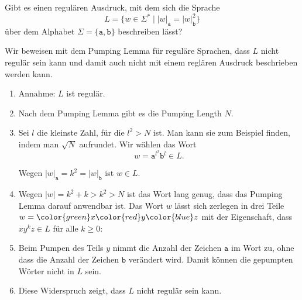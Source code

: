 Gibt es einen regulären Ausdruck, mit dem sich die Sprache
\[
L=\{w\in\Sigma^*\mid |w|_{\texttt{a}} = |w|_{\texttt{b}}^2\}
\]
über dem Alphabet $\Sigma=\{\texttt{a},\texttt{b}\}$
beschreiben lässt?


\begin{loesung}
Wir beweisen mit dem Pumping Lemma für reguläre Sprachen, dass $L$
nicht regulär sein kann und damit auch nicht mit einem reglären Ausdruck
beschrieben werden kann.
\begin{enumerate}
\item Annahme: $L$ ist regulär.
\item Nach dem Pumping Lemma gibt es die Pumping Length $N$.
\item Sei $l$ die kleinste Zahl, für die $l^2>N$ ist. 
Man kann sie zum Beispiel finden, indem man $\sqrt{N}$ aufrundet.
Wir wählen das Wort
\[
w
=
\texttt{a}^{l^2}\texttt{b}^l
\in
L.
\]
\begin{center}
\end{center}
Wegen $|w|_{\texttt{a}} = k^2 = |w|_{\texttt{b}}$ ist $w\in L$.
\item
Wegen $|w|=k^2+k>k^2>N$ ist das Wort lang genug, dass das Pumping Lemma
darauf anwendbar ist.
Das Wort $w$ lässt sich zerlegen in drei Teile
$w={\color{green}x}{\color{red}y}{\color{blue}z}$ mit der
Eigenschaft, dass $xy^kz\in L$ für alle $k\ge 0$:
\begin{center}
\end{center}
\item
Beim Pumpen des Teils $y$ nimmt die Anzahl der Zeichen $\texttt{a}$ 
im Wort zu, ohne dass die Anzahl der Zeichen $\texttt{b}$ verändert wird.
Damit können die gepumpten Wörter nicht in $L$ sein.
\item Diese Widerspruch zeigt, dass $L$ nicht regulär sein kann.
\qedhere
\end{enumerate}
\end{loesung}

